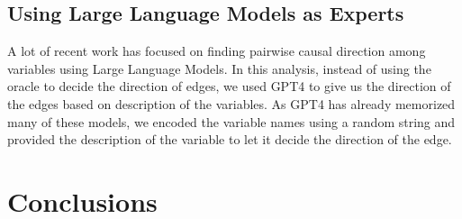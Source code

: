 \documentclass[letterpaper]{article} %
\begin{document}
\subsection{Using Large Language Models as Experts}
A lot of recent work has focused on finding pairwise causal direction among
variables using Large Language Models. In this analysis, instead of using the
oracle to decide the direction of edges, we used GPT4 to give us the direction
of the edges based on description of the variables. As GPT4 has already
memorized many of these models, we encoded the variable names using a random
string and provided the description of the variable to let it decide the
direction of the edge.

\section{Conclusions}


\end{document}
